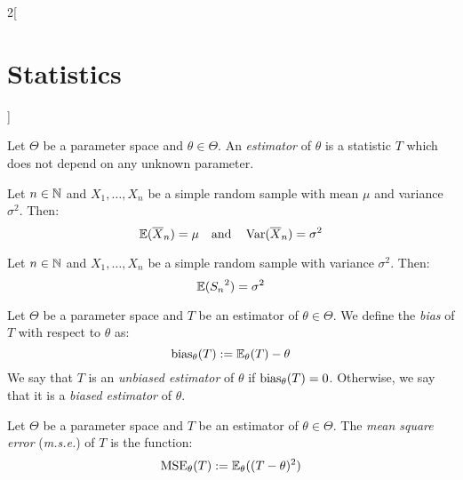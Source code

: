 \documentclass[../../../main.tex]{subfiles}
\begin{document}
\begin{multicols}{2}[\section{Statistics}]
\begin{definition}
  \end{definition}
  \begin{definition}
    Let $\Theta$ be a parameter space and $\theta\in\Theta$. An \emph{estimator} of $\theta$ is a statistic $T$ which does not depend on any unknown parameter.
  \end{definition}
  \begin{prop}
    Let $n\in\mathbb{N}$ and $X_1,\ldots,X_n$ be a simple random sample with mean $\mu$ and variance $\sigma^2$. Then: $$\mathbb{E}(\overline{X}_n)=\mu\quad\text{and}\quad\operatorname{Var}(\overline{X}_n)=\sigma^2$$
  \end{prop}
  \begin{prop}
    Let $n\in\mathbb{N}$ and $X_1,\ldots,X_n$ be a simple random sample with variance $\sigma^2$. Then: $$\mathbb{E}({S_n}^2)=\sigma^2$$
  \end{prop}
  \begin{definition}
    Let $\Theta$ be a parameter space and $T$ be an estimator of $\theta\in\Theta$. We define the \emph{bias} of $T$ with respect to $\theta$ as: $$\operatorname{bias}_\theta(T):=\mathbb{E}_\theta(T)-\theta$$ We say that $T$ is an \emph{unbiased estimator} of $\theta$ if $\operatorname{bias}_\theta(T)=0$. Otherwise, we say that it is a \emph{biased estimator} of $\theta$.
  \end{definition}
  \begin{definition}
    Let $\Theta$ be a parameter space and $T$ be an estimator of $\theta\in\Theta$. The \emph{mean square error} (\emph{m.s.e.}) of $T$ is the function: $$\text{MSE}_\theta(T):=\mathbb{E}_\theta((T-\theta)^2)$$
  \end{definition}
\end{multicols}
\end{document}
